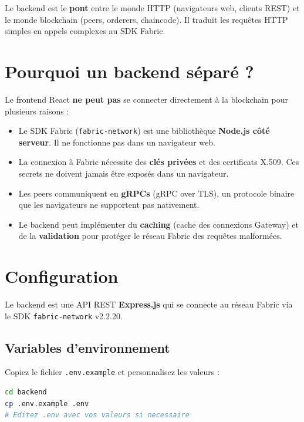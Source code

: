 \documentclass[12pt,a4paper,twoside]{report}
\begin{document}
Le backend est le \textbf{pont} entre le monde HTTP (navigateurs web, clients REST) et le monde blockchain (peers, orderers, chaincode). Il traduit les requêtes HTTP simples en appels complexes au SDK Fabric.

\section{Pourquoi un backend séparé ?}

\begin{infobox}
Le frontend React \textbf{ne peut pas} se connecter directement à la blockchain pour plusieurs raisons :
\begin{itemize}
    \item Le SDK Fabric (\texttt{fabric-network}) est une bibliothèque \textbf{Node.js côté serveur}. Il ne fonctionne pas dans un navigateur web.
    \item La connexion à Fabric nécessite des \textbf{clés privées} et des certificats X.509. Ces secrets ne doivent jamais être exposés dans un navigateur.
    \item Les peers communiquent en \textbf{gRPCs} (gRPC over TLS), un protocole binaire que les navigateurs ne supportent pas nativement.
    \item Le backend peut implémenter du \textbf{caching} (cache des connexions Gateway) et de la \textbf{validation} pour protéger le réseau Fabric des requêtes malformées.
\end{itemize}
\end{infobox}

\section{Configuration}

Le backend est une API REST \textbf{Express.js} qui se connecte au réseau Fabric via le SDK \texttt{fabric-network} v2.2.20.

\subsection{Variables d'environnement}

Copiez le fichier \texttt{.env.example} et personnalisez les valeurs :

\begin{lstlisting}[language=bash, caption=Configuration du backend]
cd backend
cp .env.example .env
# Editez .env avec vos valeurs si necessaire
\end{lstlisting}
\end{document}

